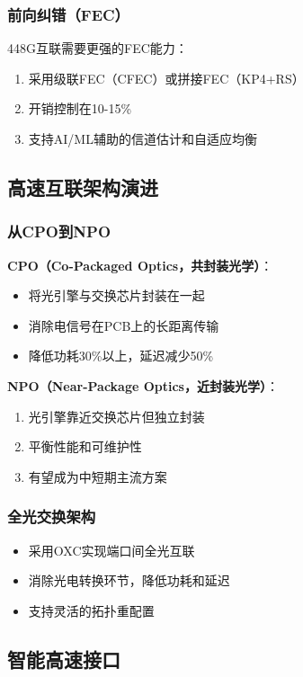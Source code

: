 \subsubsection{前向纠错（FEC）}

448G互联需要更强的FEC能力：
\begin{enumerate}
    \item 采用级联FEC（CFEC）或拼接FEC（KP4+RS）
    \item 开销控制在10-15\%
    \item 支持AI/ML辅助的信道估计和自适应均衡
\end{enumerate}

\subsection{高速互联架构演进}

\subsubsection{从CPO到NPO}

\textbf{CPO（Co-Packaged Optics，共封装光学）}：
\begin{itemize}
    \item 将光引擎与交换芯片封装在一起
    \item 消除电信号在PCB上的长距离传输
    \item 降低功耗30\%以上，延迟减少50\%
\end{itemize}

\textbf{NPO（Near-Package Optics，近封装光学）}：
\begin{enumerate}
    \item 光引擎靠近交换芯片但独立封装
    \item 平衡性能和可维护性
    \item 有望成为中短期主流方案
\end{enumerate}

\subsubsection{全光交换架构}

\begin{itemize}
    \item 采用OXC实现端口间全光互联
    \item 消除光电转换环节，降低功耗和延迟
    \item 支持灵活的拓扑重配置
\end{itemize}

\subsection{智能高速接口}

